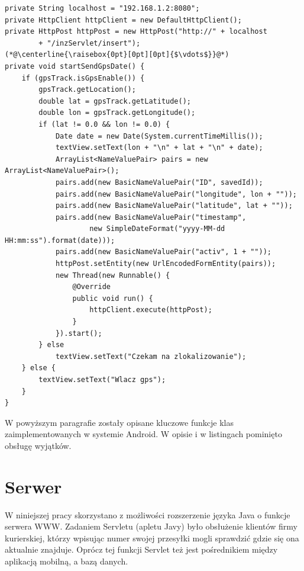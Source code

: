 \documentclass[eng,printmode,oneside]{mgr}
\begin{document}
\begin{lstlisting}[caption=Metoda startSendGpsDate() klasy
Main.java. Metoda sprawdza stan sygnału GPS i przygotowuje wiadomość do
wysłania na serwer oraz wysyła ją,label=lst:Main.startSendGpsDate.java]
private String localhost = "192.168.1.2:8080";
private HttpClient httpClient = new DefaultHttpClient();
private HttpPost httpPost = new HttpPost("http://" + localhost
		+ "/inzServlet/insert");
(*@\centerline{\raisebox{0pt}[0pt][0pt]{$\vdots$}}@*)
private void startSendGpsDate() {
	if (gpsTrack.isGpsEnable()) {
		gpsTrack.getLocation();
		double lat = gpsTrack.getLatitude();
		double lon = gpsTrack.getLongitude();
		if (lat != 0.0 && lon != 0.0) {
			Date date = new Date(System.currentTimeMillis());
			textView.setText(lon + "\n" + lat + "\n" + date);
			ArrayList<NameValuePair> pairs = new ArrayList<NameValuePair>();
			pairs.add(new BasicNameValuePair("ID", savedId));
			pairs.add(new BasicNameValuePair("longitude", lon + ""));
			pairs.add(new BasicNameValuePair("latitude", lat + ""));
			pairs.add(new BasicNameValuePair("timestamp",
					new SimpleDateFormat("yyyy-MM-dd HH:mm:ss").format(date)));
			pairs.add(new BasicNameValuePair("activ", 1 + ""));
			httpPost.setEntity(new UrlEncodedFormEntity(pairs));
			new Thread(new Runnable() {
				@Override
				public void run() {
					httpClient.execute(httpPost);
				}
			}).start();
		} else
			textView.setText("Czekam na zlokalizowanie");
	} else {
		textView.setText("Wlacz gps");
	}
}
\end{lstlisting}

W powyższym paragrafie zostały opisane kluczowe funkcje klas zaimplementowanych
w systemie Android. W opisie i w listingach pominięto obsługę wyjątków. 

\section{Serwer}

W niniejszej pracy skorzystano z możliwości rozszerzenie języka Java o funkcje
serwera WWW. Zadaniem Servletu (apletu Javy) było obsłużenie klientów firmy
kurierskiej, którzy wpisując numer swojej przesyłki mogli sprawdzić gdzie się
ona aktualnie znajduje. Oprócz tej funkcji Servlet też jest pośrednikiem
między aplikacją mobilną, a bazą danych.
\end{document}
